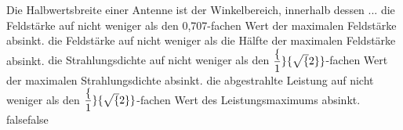     {Die Halbwertsbreite einer Antenne ist der Winkelbereich, innerhalb dessen ...}
    {die Feldstärke auf nicht weniger als den 0,707-fachen Wert der maximalen Feldstärke absinkt.}
    {die Feldstärke auf nicht weniger als die Hälfte der maximalen Feldstärke absinkt.}
    {die Strahlungsdichte auf nicht weniger als den $\dfrac\{1\}\{\sqrt\{2\}\}$-fachen Wert der maximalen Strahlungsdichte absinkt.}
    {die abgestrahlte Leistung auf nicht weniger als den $\dfrac\{1\}\{\sqrt\{2\}\}$-fachen Wert des Leistungsmaximums absinkt.}
    {false}{false}